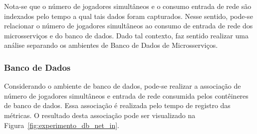 Nota-se que o número de jogadores simultâneos e o consumo entrada de rede são indexados pelo tempo a qual tais dados foram capturados.
%
Nesse sentido, pode-se relacionar o número de jogadores simultâneos ao consumo de entrada de rede dos microsserviços e do banco de dados.
%
Dado tal contexto, faz sentido realizar uma análise separando os ambientes de Banco de Dados de Microsserviços.

\subsubsection{Banco de Dados}

Considerando o ambiente de banco de dados, pode-se realizar a associação de número de jogadores simultâneos e entrada de rede consumida pelos contêineres de banco de dados.
%
Essa associação é realizada pelo tempo de registro das métricas.
%
O resultado desta associação pode ser visualizado na Figura~\ref{fig:experimento_db_net_in}.


